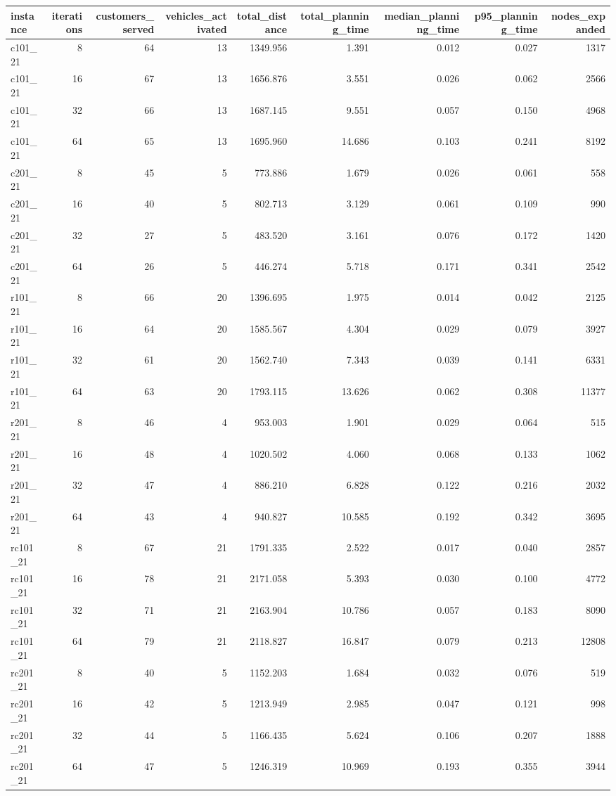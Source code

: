 \begin{tabular}{lrrrrrrrr}
\toprule
instance & iterations & customers\_served & vehicles\_activated & total\_distance & total\_planning\_time & median\_planning\_time & p95\_planning\_time & nodes\_expanded \\
\midrule
c101\_21 & 8 & 64 & 13 & 1349.956 & 1.391 & 0.012 & 0.027 & 1317 \\
c101\_21 & 16 & 67 & 13 & 1656.876 & 3.551 & 0.026 & 0.062 & 2566 \\
c101\_21 & 32 & 66 & 13 & 1687.145 & 9.551 & 0.057 & 0.150 & 4968 \\
c101\_21 & 64 & 65 & 13 & 1695.960 & 14.686 & 0.103 & 0.241 & 8192 \\
c201\_21 & 8 & 45 & 5 & 773.886 & 1.679 & 0.026 & 0.061 & 558 \\
c201\_21 & 16 & 40 & 5 & 802.713 & 3.129 & 0.061 & 0.109 & 990 \\
c201\_21 & 32 & 27 & 5 & 483.520 & 3.161 & 0.076 & 0.172 & 1420 \\
c201\_21 & 64 & 26 & 5 & 446.274 & 5.718 & 0.171 & 0.341 & 2542 \\
r101\_21 & 8 & 66 & 20 & 1396.695 & 1.975 & 0.014 & 0.042 & 2125 \\
r101\_21 & 16 & 64 & 20 & 1585.567 & 4.304 & 0.029 & 0.079 & 3927 \\
r101\_21 & 32 & 61 & 20 & 1562.740 & 7.343 & 0.039 & 0.141 & 6331 \\
r101\_21 & 64 & 63 & 20 & 1793.115 & 13.626 & 0.062 & 0.308 & 11377 \\
r201\_21 & 8 & 46 & 4 & 953.003 & 1.901 & 0.029 & 0.064 & 515 \\
r201\_21 & 16 & 48 & 4 & 1020.502 & 4.060 & 0.068 & 0.133 & 1062 \\
r201\_21 & 32 & 47 & 4 & 886.210 & 6.828 & 0.122 & 0.216 & 2032 \\
r201\_21 & 64 & 43 & 4 & 940.827 & 10.585 & 0.192 & 0.342 & 3695 \\
rc101\_21 & 8 & 67 & 21 & 1791.335 & 2.522 & 0.017 & 0.040 & 2857 \\
rc101\_21 & 16 & 78 & 21 & 2171.058 & 5.393 & 0.030 & 0.100 & 4772 \\
rc101\_21 & 32 & 71 & 21 & 2163.904 & 10.786 & 0.057 & 0.183 & 8090 \\
rc101\_21 & 64 & 79 & 21 & 2118.827 & 16.847 & 0.079 & 0.213 & 12808 \\
rc201\_21 & 8 & 40 & 5 & 1152.203 & 1.684 & 0.032 & 0.076 & 519 \\
rc201\_21 & 16 & 42 & 5 & 1213.949 & 2.985 & 0.047 & 0.121 & 998 \\
rc201\_21 & 32 & 44 & 5 & 1166.435 & 5.624 & 0.106 & 0.207 & 1888 \\
rc201\_21 & 64 & 47 & 5 & 1246.319 & 10.969 & 0.193 & 0.355 & 3944 \\
\bottomrule
\end{tabular}
